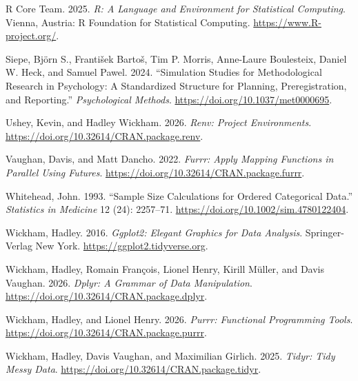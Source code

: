 \documentclass[
  man,
  floatsintext]{apa7}
\newlength{\cslhangindent}
\newenvironment{CSLReferences}[2] %
 {\begin{list}{}{%
  \setlength{\itemindent}{0pt}
  \setlength{\leftmargin}{0pt}
  \setlength{\parsep}{0pt}
  \ifodd #1
   \setlength{\leftmargin}{\cslhangindent}
   \setlength{\itemindent}{-1\cslhangindent}
  \fi
  \setlength{\itemsep}{#2\baselineskip}}}
 {\end{list}}
\begin{document}
\begin{CSLReferences}{1}{0}
R Core Team. 2025. \emph{R: A Language and Environment for Statistical
Computing}. Vienna, Austria: R Foundation for Statistical Computing.
\url{https://www.R-project.org/}.

Siepe, Björn S., František Bartoš, Tim P. Morris, Anne-Laure Boulesteix,
Daniel W. Heck, and Samuel Pawel. 2024. {``Simulation Studies for
Methodological Research in Psychology: A Standardized Structure for
Planning, Preregistration, and Reporting.''} \emph{Psychological
Methods}. \url{https://doi.org/10.1037/met0000695}.

Ushey, Kevin, and Hadley Wickham. 2026. \emph{Renv: Project
Environments}. \url{https://doi.org/10.32614/CRAN.package.renv}.

Vaughan, Davis, and Matt Dancho. 2022. \emph{Furrr: Apply Mapping
Functions in Parallel Using Futures}.
\url{https://doi.org/10.32614/CRAN.package.furrr}.

Whitehead, John. 1993. {``{Sample Size Calculations for Ordered
Categorical Data}.''} \emph{Statistics in Medicine} 12 (24): 2257--71.
\url{https://doi.org/10.1002/sim.4780122404}.

Wickham, Hadley. 2016. \emph{Ggplot2: Elegant Graphics for Data
Analysis}. Springer-Verlag New York.
\url{https://ggplot2.tidyverse.org}.

Wickham, Hadley, Romain François, Lionel Henry, Kirill Müller, and Davis
Vaughan. 2026. \emph{Dplyr: A Grammar of Data Manipulation}.
\url{https://doi.org/10.32614/CRAN.package.dplyr}.

Wickham, Hadley, and Lionel Henry. 2026. \emph{Purrr: Functional
Programming Tools}. \url{https://doi.org/10.32614/CRAN.package.purrr}.

Wickham, Hadley, Davis Vaughan, and Maximilian Girlich. 2025.
\emph{Tidyr: Tidy Messy Data}.
\url{https://doi.org/10.32614/CRAN.package.tidyr}.

\end{CSLReferences}
\end{document}
